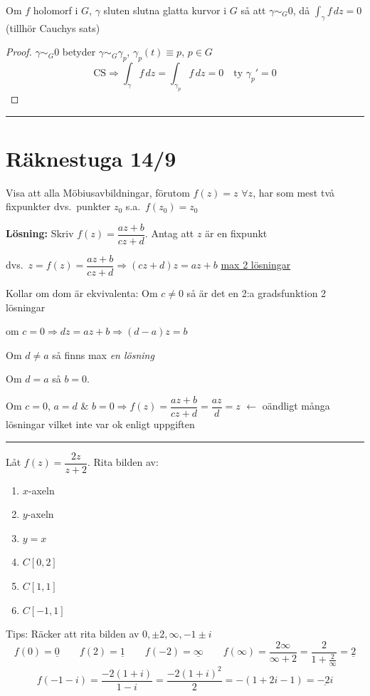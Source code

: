 \begin{theorem}[Kor 4.20]
Om $f$ holomorf i $G$, $\gamma$ sluten slutna glatta kurvor i $G$ så att $\gamma \sim_G 0$, då $\displaystyle\int_\gamma f\,dz = 0$ \quad \textcolor{magenta!80!black}{(tillhör Cauchys sats)}
\end{theorem}
\begin{proof}
$\gamma \sim_G 0$ betyder $\gamma \sim_G \gamma_p$, $\gamma_p(t) \equiv p$, $p \in G$
\[ \text{CS} \Rightarrow \int_\gamma f\,dz = \int_{\gamma_p} f\,dz = 0 \quad \text{ty } \gamma_p' = 0 \]
\end{proof}

\noindent\rule{\linewidth}{0.4pt}

\section{Räknestuga 14/9}

 \quad Visa att alla Möbiusavbildningar, förutom $f(z) = z$ $\forall z$, har som mest två fixpunkter dvs.\ punkter $z_0$ s.a.\ $f(z_0) = z_0$

\textbf{Lösning:} Skriv $f(z) = \dfrac{az + b}{cz + d}$. Antag att $z$ är en fixpunkt

dvs.\ $z = f(z) = \dfrac{az + b}{cz + d} \Rightarrow (cz + d)z = az + b$ \quad \textcolor{magenta!80!black}{\underline{max 2 lösningar}}

Kollar om dom är ekvivalenta: Om $c \neq 0$ så är det en 2:a gradsfunktion \textcolor{magenta!80!black}{2 lösningar}

om $c = 0 \Rightarrow dz = az + b \Rightarrow (d - a)z = b$

Om $d \neq a$ så finns max \emph{en lösning}

Om $d = a$ så $b = 0$.

Om $c = 0$, $a = d$ \& $b = 0 \Rightarrow f(z) = \dfrac{az + b}{cz + d} = \dfrac{az}{d} = z$ \quad \textcolor{magenta!80!black}{$\leftarrow$ oändligt många lösningar vilket inte var ok enligt uppgiften}

\noindent\rule{\linewidth}{0.4pt}

 \quad Låt $f(z) = \dfrac{2z}{z + 2}$. Rita bilden av:
\begin{enumerate}[label=\alph*)]
  \item $x$-axeln
  \item $y$-axeln
  \item $y = x$
  \item $C[0, 2]$
  \item $C[1, 1]$
  \item $C[-1, 1]$
\end{enumerate}
\textcolor{blue!60!black}{Tips: Räcker att rita bilden av $0, \pm 2, \infty, -1 \pm i$}
\[ f(0) = \underline{0} \qquad f(2) = \underline{1} \qquad f(-2) = \underline{\infty} \qquad f(\infty) = \frac{2\infty}{\infty + 2} = \frac{2}{1 + \frac{2}{\infty}} = \underline{2} \]
\[ f(-1 - i) = \frac{-2(1 + i)}{1 - i} = \frac{-2(1 + i)^2}{2} = -(1 + 2i - 1) = \underline{-2i} \]
